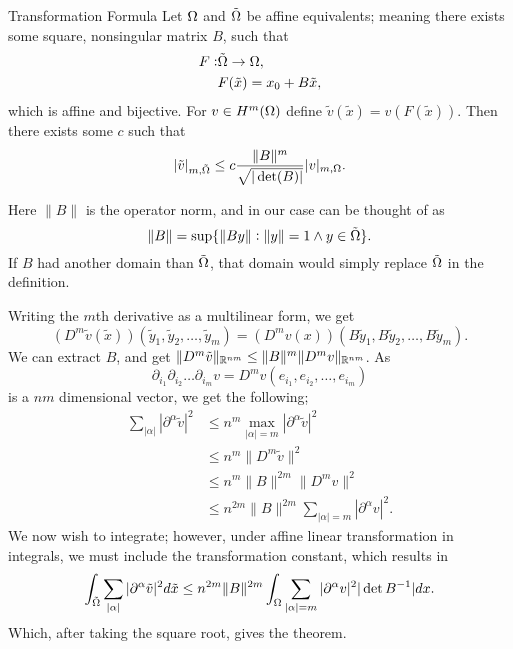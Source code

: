 \begin{thmx}{Transformation Formula\label{thm:transformation}}
    Let $\Omega$ and $\tilde{\Omega}$ be affine equivalents; meaning 
    there exists some square, nonsingular matrix $B$, such that 
    \begin{align*}
        F:&\tilde{\Omega}\to \Omega, \\
        & F(\tilde{x}) = x_0 + B\tilde{x},
    \end{align*}
    which is affine and bijective. For $v\in H^m(\Omega)$ define 
    $\tilde{v}(\tilde{x}) = v(F(\tilde{x}))$.
    Then there exists some $c$ such that 
    \begin{equation*}
        |\tilde{v}|_{m,\tilde{\Omega}} \leq 
        c \frac{\|B\|^m }{\sqrt{|\det(B)|}}|v|_{m,\Omega}.
    \end{equation*}
\end{thmx}
Here $\|B\|$ is the operator norm, and in our case can be thought of 
as 
\begin{equation*}
    \|B\| = \sup\{ \| By\| :\|y\| = 1 \land y \in \tilde{\Omega} \}.
\end{equation*}
If $B$ had another domain than $\tilde{\Omega}$, that domain would simply 
replace $\tilde{\Omega}$ in the definition.
\begin{bev}
   Writing the $m$th derivative as a multilinear form, we get 
   \begin{equation*}
    (D^m\tilde{v}(\tilde{x}))(\tilde{y}_1, \tilde{y}_2, \ldots, \tilde{y}_m )=
    (D^m v(x))(B\tilde{y}_1, B\tilde{y}_2, \ldots, B\tilde{y}_m ).
   \end{equation*} 
We can extract $B$, and get $\|D^m \tilde{v}\|_{\mathbb{R}^{nm}} \leq \|B\|^m \|D^m v\|_{\mathbb{R}^{nm}}$.
As 
\[\partial_{i_{1}}\partial_{i_{2}}\ldots \partial_{i_{m}} v = D^m v(e_{i_1},e_{i_2}, \ldots, e_{i_m})\]
is a $nm$ dimensional vector, we get the following;
\begin{align*}
    \sum_{|\alpha|} | \partial ^\alpha \tilde{v} |^2 & \leq n^m \max_{|\alpha|=m} |\partial ^\alpha \tilde{v}|^2 \\
    &\leq n^m \|D^m\tilde{v}\|^2 \\
    &\leq n^m \|B\|^{2m}\|D^m v\|^2 \\
    &\leq n^{2m}\|B\|^{2m} \sum_{|\alpha|=m}|\partial ^\alpha v|^2.
\end{align*}
We now wish to integrate; however, under affine linear transformation in integrals, 
we must include the transformation constant, which results in 
\begin{equation*}
    \int_{\tilde{\Omega}} \sum_{|\alpha|} | \partial ^\alpha \tilde{v} |^2 d\tilde{x}
    \leq n^{2m}\|B\|^{2m}\int_{\Omega} \sum_{|\alpha|=m}|\partial ^\alpha v|^2 |\det B^{-1}| dx.
\end{equation*}
Which, after taking the square root, gives the theorem.
\end{bev}